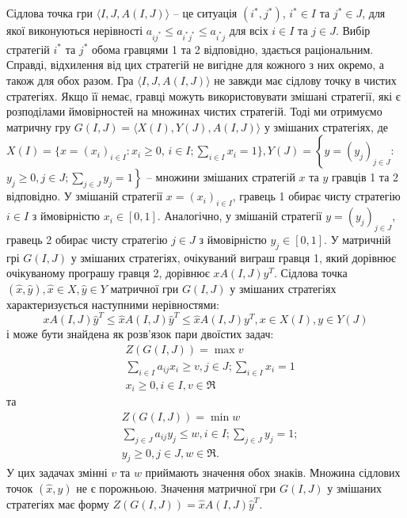 \documentclass[14pt, a4paper, oneside]{extarticle}
\numberwithin{equation}{section}
\begin{document}
Сідлова точка гри $\langle I, J, A(I, J)\rangle$ -- це ситуація $\left(i^*, j^*\right)$, $i^* \in I$ та $j^* \in J$, для якої виконуються нерівності $a_{ij^*} \leq a_{i^*j^*} \leq a_{i^*j}$ для всіх $i \in I$ та $j \in J$. Вибір стратегій $i^*$ та $j^*$ обома гравцями 1 та 2 відповідно, здається раціональним. Справді, відхилення від цих стратегій не вигідне для кожного з них окремо, а також для обох разом. Гра $\langle I, J, A(I, J)\rangle$ не завжди має сідлову точку в чистих стратегіях. Якщо її немає, гравці можуть використовувати змішані стратегії, які є розподілами ймовірностей на множинах чистих стратегій. Тоді ми отримуємо матричну гру $G(I, J)=\langle X(I), Y(J), A(I, J)\rangle$ у змішаних стратегіях, де $X(I)=\{x=\left(x_i\right)_{i \in I}: x_i \geq 0$,
$i \in I; \sum_{i \in I} x_i=1\}, Y(J)=\left\{y=\left(y_j\right)_{j \in J}:\right.$ $\left.y_j \geq 0, j \in J ; \sum_{j \in J} y_j=1\right\}$ -- множини змішаних стратегій $x$ та $y$ гравців 1 та 2 відповідно. У змішаній стратегії $x=\left(x_i\right)_{i \in I}$, гравець 1 обирає чисту стратегію $i \in I$ з ймовірністю $x_i \in[0,1]$. Аналогічно, у змішаній стратегії $y=\left(y_j\right)_{j \in J}$, гравець 2 обирає чисту стратегію $j \in J$ з ймовірністю $y_j \in[0,1]$. У матричній грі $G(I, J)$ у змішаних стратегіях, очікуваний виграш гравця 1, який дорівнює очікуваному програшу гравця 2, дорівнює $x A(I, J) y^T$. Сідлова точка $(\hat{x}, \hat{y}), \hat{x} \in X, \hat{y} \in Y$ матричної гри $G(I, J)$ у змішаних стратегіях характеризується наступними нерівностями:
\begin{equation*}
x A(I, J) \hat{y}^T \leq \hat{x} A(I, J) \hat{y}^T \leq \hat{x} A(I, J) y^T, x \in X(I), y \in Y(J)
\end{equation*}
і може бути знайдена як розв'язок пари двоїстих задач:
\begin{align}\label{zadah}
& Z(G(I, J))=\max v \\
& \sum_{i \in I} a_{ij} x_i \geq v, j \in J ; \sum_{i \in I} x_i=1 \\
& x_i \geq 0, i \in I, v \in \Re
\end{align}
та
\begin{align}
& Z(G(I, J))=\min w \\
& \sum_{j \in J} a_{ij} y_j \leq w, i \in I ; \sum_{j \in J} y_j=1 ;\\
& y_j \geq 0, j \in J, w \in \Re .
\end{align}
У цих задачах змінні $v$ та $w$ приймають значення обох знаків. Множина сідлових точок $(\hat{x}, \hat{y})$ не є порожньою. Значення матричної гри $G(I, J)$ у змішаних стратегіях має форму $Z(G(I, J))=\hat{x} A(I, J) \hat{y}^T$.
\end{document}
